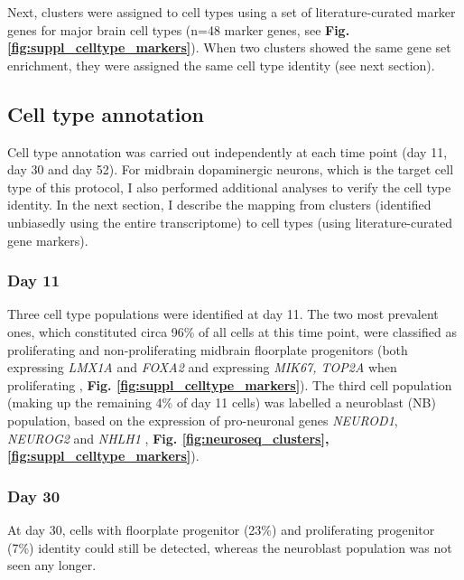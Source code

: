 Next, clusters were assigned to cell types using a set of literature-curated marker genes for major brain cell types (n=48 marker genes, see \textbf{Fig. \ref{fig:suppl_celltype_markers}}).
When two clusters showed the same gene set enrichment, they were assigned the same cell type identity (see next section).

\subsection{Cell type annotation}
Cell type annotation was carried out independently at each time point (day 11, day 30 and day 52).
For midbrain dopaminergic neurons, which is the target cell type of this protocol, I also performed additional analyses to verify the cell type identity.
In the next section, I describe the mapping from clusters (identified unbiasedly using the entire transcriptome) to cell types (using literature-curated gene markers).

\subsubsection{Day 11}

Three cell type populations were identified at day 11.
The two most prevalent ones, which constituted circa 96\% of all cells at this time point, were classified as proliferating and non-proliferating midbrain floorplate progenitors (both expressing \textit{LMX1A} and \textit{FOXA2} and expressing \textit{MIK67, TOP2A} when proliferating \cite{la2016molecular}, \textbf{Fig. \ref{fig:suppl_celltype_markers}}).
The third cell population (making up the remaining 4\% of day 11 cells) was labelled a neuroblast (NB) population, based on the expression of pro-neuronal genes \textit{NEUROD1}, \textit{NEUROG2} and \textit{NHLH1} \cite{bertrand2002proneural, lacomme2012neurog2}, \textbf{Fig. \ref{fig:neuroseq_clusters}, \ref{fig:suppl_celltype_markers}}).

\subsubsection{Day 30}

At day 30, cells with floorplate progenitor (23\%) and proliferating progenitor (7\%) identity could still be detected, whereas the neuroblast population was not seen any longer.

